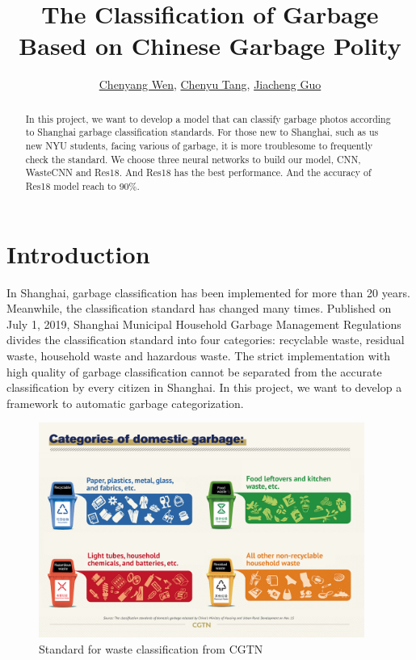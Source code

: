 \documentclass{article}
\title{The Classification of Garbage Based on Chinese Garbage Polity}
\author{\href{mailto:cw3923@nyu.edu}{Chenyang Wen}, \href{mailto:ct2831@nyu.edu}{Chenyu Tang},
\href{mailto:jg5315@nyu.edu}{Jiacheng Guo}}
\date{\vspace{-5ex}} %
\begin{document}
\maketitle
\thispagestyle{firstpage}


\begin{abstract}
    In this project, we want to develop a model that can classify garbage photos according to Shanghai garbage classification standards. For those new to Shanghai, such as us new NYU students, facing various of garbage, it is more troublesome to frequently check the standard. We choose three neural networks to build our model, CNN, WasteCNN and Res18. And Res18 has the best performance. And the accuracy of Res18 model reach to 90\%.
\end{abstract}


\section*{Introduction}
In Shanghai, garbage classification has been implemented for more than 20 years. Meanwhile, the classification standard has changed many times. Published on July 1, 2019, Shanghai Municipal Household Garbage Management Regulations divides the classification standard into four categories: recyclable waste, residual waste, household waste and hazardous waste. The strict implementation with high quality of garbage classification cannot be separated from the accurate classification by every citizen in Shanghai. In this project, we want to develop a framework to automatic garbage categorization.

\begin{figure}[!h]
    \begin{centering}
    \includegraphics[width=0.95\textwidth]{categories.jpeg}
    \par\end{centering}
    \caption{Standard for waste classification from CGTN\cite{cgtn}}
    \label{fig:Trash_classification}
\end{figure}
\end{document}
